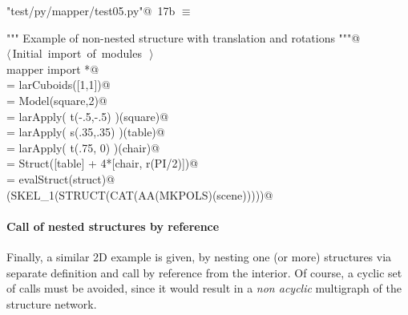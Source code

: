 \documentclass[11pt,oneside]{article}	%
\begin{document}
\begin{flushleft} \small \label{scrap32}
\protect{}\verb@"test/py/mapper/test05.py"@\nobreak\ {\footnotesize 17b }$\equiv$
\vspace{-1ex}
\begin{list}{}{} \item
\mbox{}\verb@""" Example of non-nested structure with translation and rotations """@\\
\mbox{}\verb@@\hbox{$\langle\,$Initial import of modules\nobreak\ {\footnotesize {}}$\,\rangle$}\verb@@\\
\mbox{}\verb@from mapper import *@\\
\mbox{}\verb@square = larCuboids([1,1])@\\
\mbox{}\verb@square = Model(square,2)@\\
\mbox{}\verb@table = larApply( t(-.5,-.5) )(square)@\\
\mbox{}\verb@chair = larApply( s(.35,.35) )(table)@\\
\mbox{}\verb@chair = larApply( t(.75, 0) )(chair)@\\
\mbox{}\verb@struct = Struct([table] + 4*[chair, r(PI/2)])@\\
\mbox{}\verb@scene = evalStruct(struct)@\\
\mbox{}\verb@VIEW(SKEL_1(STRUCT(CAT(AA(MKPOLS)(scene)))))@\\
\mbox{}\verb@@{\NWsep}
\end{list}
\vspace{-2ex}
\end{flushleft}

\paragraph{Call of nested structures by reference}
Finally, a similar 2D example is given, by nesting one (or more) structures via separate definition and call by reference from the interior. Of course, a cyclic set of calls must be avoided, since it would result in a \emph{non acyclic} multigraph of the structure network.
\end{document}
